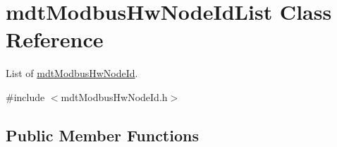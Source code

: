\hypertarget{classmdt_modbus_hw_node_id_list}{\section{mdt\-Modbus\-Hw\-Node\-Id\-List Class Reference}
\label{classmdt_modbus_hw_node_id_list}
}


List of \hyperlink{classmdt_modbus_hw_node_id}{mdt\-Modbus\-Hw\-Node\-Id}.  




{\ttfamily \#include $<$mdt\-Modbus\-Hw\-Node\-Id.\-h$>$}

\subsection*{Public Member Functions}
